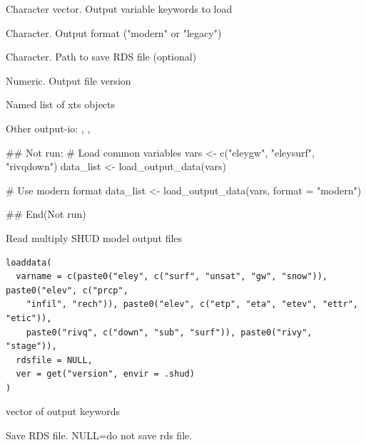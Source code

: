 \documentclass[a4paper]{book}
\begin{document}
%
\begin{Arguments}
\begin{ldescription}
\item[\code{variables}] Character vector. Output variable keywords to load

\item[\code{format}] Character. Output format ("modern" or "legacy")

\item[\code{save\_rds}] Character. Path to save RDS file (optional)

\item[\code{version}] Numeric. Output file version
\end{ldescription}
\end{Arguments}
%
\begin{Value}
Named list of xts objects
\end{Value}
%
\begin{SeeAlso}\relax
Other output-io: 
,
,
\end{SeeAlso}
%
\begin{Examples}
\begin{ExampleCode}
## Not run: 
# Load common variables
vars <- c("eleygw", "eleysurf", "rivqdown")
data_list <- load_output_data(vars)

# Use modern format
data_list <- load_output_data(vars, format = "modern")

## End(Not run)
\end{ExampleCode}
\end{Examples}
%
\begin{Description}\relax
Read multiply SHUD model output files
\end{Description}
%
\begin{Usage}
\begin{verbatim}
loaddata(
  varname = c(paste0("eley", c("surf", "unsat", "gw", "snow")), paste0("elev", c("prcp",
    "infil", "rech")), paste0("elev", c("etp", "eta", "etev", "ettr", "etic")),
    paste0("rivq", c("down", "sub", "surf")), paste0("rivy", "stage")),
  rdsfile = NULL,
  ver = get("version", envir = .shud)
)
\end{verbatim}
\end{Usage}
%
\begin{Arguments}
\begin{ldescription}
\item[\code{varname}] vector of output keywords

\item[\code{rdsfile}] Save RDS file. NULL=do not save rds file.
\end{ldescription}
\end{Arguments}
\end{document}
